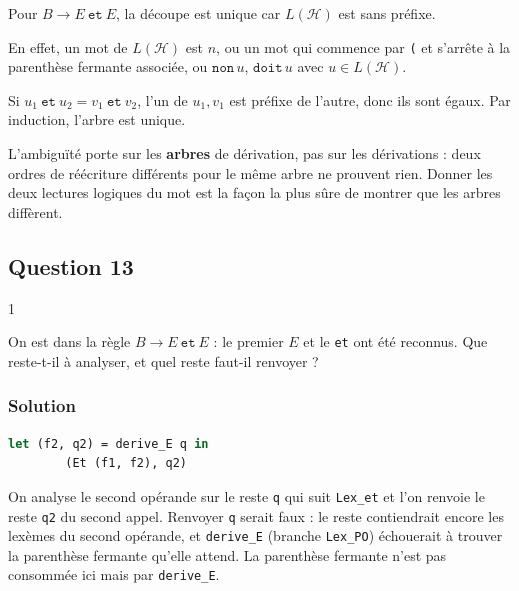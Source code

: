 \documentclass[11pt,a4paper]{article}
\begin{document}
Pour \(B\to E\ \mathtt{et}\ E\), la découpe est unique car \(L(\mathcal H)\) est sans préfixe.

En effet, un mot de \(L(\mathcal H)\) est \(n\), ou un mot qui commence par \texttt{(} et s'arrête à la parenthèse fermante associée, ou \(\mathtt{non}\,u\), \(\mathtt{doit}\,u\) avec \(u\in L(\mathcal H)\).

Si \(u_1\ \mathtt{et}\ u_2=v_1\ \mathtt{et}\ v_2\), l'un de \(u_1,v_1\) est préfixe de l'autre, donc ils sont égaux. Par induction, l'arbre est unique.

\begin{piege}

L'ambiguïté porte sur les \textbf{arbres} de dérivation, pas sur les dérivations : deux ordres de réécriture différents pour le même arbre ne prouvent rien. Donner les deux lectures logiques du mot est la façon la plus sûre de montrer que les arbres diffèrent.

\end{piege}

\hypertarget{question-13}{%
\subsection{Question 13}\label{question-13}}

\begin{indication}{1}

On est dans la règle \(B\to E\ \mathtt{et}\ E\) : le premier \(E\) et le \texttt{et} ont été reconnus. Que reste-t-il à analyser, et quel reste faut-il renvoyer ?

\end{indication}

\hypertarget{solution-12}{%
\subsubsection{Solution}\label{solution-12}}

\begin{lstlisting}[language=Caml]
        let (f2, q2) = derive_E q in
        (Et (f1, f2), q2)
\end{lstlisting}

On analyse le second opérande sur le reste \texttt{q} qui suit \texttt{Lex\_et} et l'on renvoie le reste \texttt{q2} du second appel. Renvoyer \texttt{q} serait faux : le reste contiendrait encore les lexèmes du second opérande, et \texttt{derive\_E} (branche \texttt{Lex\_PO}) échouerait à trouver la parenthèse fermante qu'elle attend. La parenthèse fermante n'est pas consommée ici mais par \texttt{derive\_E}.
\end{document}
